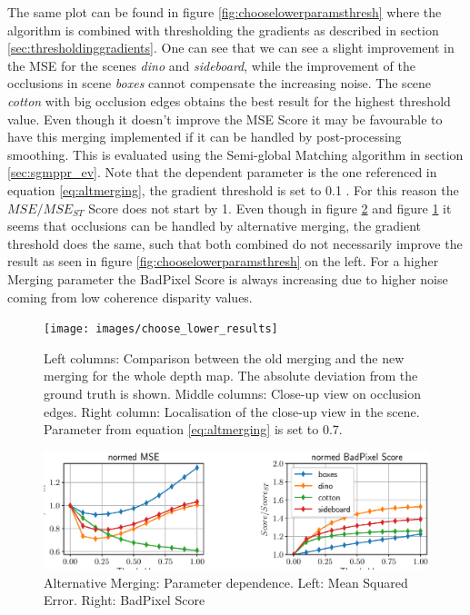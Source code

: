 \documentclass  [
  paper    = a4,
  BCOR     = 10mm,
  twoside,
  fontsize = 12pt,
  fleqn,
  toc      = bibnumbered,
  toc      = listofnumbered,
  numbers  = noendperiod,
  headings = normal,
  listof   = leveldown,
  version  = 3.03
]                                       {scrreprt}
\begin{document}
The same plot can be found in figure \ref{fig:chooselowerparamsthresh} where the algorithm is combined with thresholding the gradients as described in section \ref{sec:thresholdinggradients}. One can see that we can see a slight improvement in the MSE for the scenes \textit{dino} and \textit{sideboard}, while the improvement of the occlusions in scene \textit{boxes} cannot compensate the increasing noise. The scene \textit{cotton} with big occlusion edges obtains the best result for the highest threshold value. Even though it doesn't improve the MSE Score it may be favourable to have this merging implemented if it can be handled by post-processing smoothing. This is evaluated using the Semi-global Matching algorithm in section \ref{sec:sgmppr_ev}. Note that the dependent parameter is the one referenced in equation \ref{eq:altmerging}, the gradient threshold is set to 0.1 . For this reason the $MSE/MSE_{ST}$ Score does not start by 1. Even though in figure \ref{fig:chooselowerparams} and figure \ref{fig:chooselowerresults} it seems that occlusions can be handled by alternative merging, the gradient threshold does the same, such that both combined do not necessarily improve the result as seen in figure \ref{fig:chooselowerparamsthresh} on the left. For a higher Merging parameter the BadPixel Score is always increasing due to higher noise coming from low coherence disparity values. 


\begin{figure}
	\centering
	\texttt{[image: images/choose\_lower\_results]}
	\caption[Results from alternative merging of x- and y- direction]{Left columns: Comparison between the old merging and the new merging for the whole depth map. The absolute deviation from the ground truth is shown. Middle columns: Close-up view on occlusion edges. Right column: Localisation of the close-up view in the scene. Parameter from equation \ref{eq:altmerging} is set to 0.7.}
	\label{fig:chooselowerresults}
\end{figure}

\begin{figure}
	\centering
	\includegraphics[width=1\linewidth]{images/choose_lower_params}
	\caption[Alternative Merging: Parameter dependence]{Alternative Merging: Parameter dependence. Left: Mean Squared Error. Right: BadPixel Score}
	\label{fig:chooselowerparams}
\end{figure}
\end{document}
